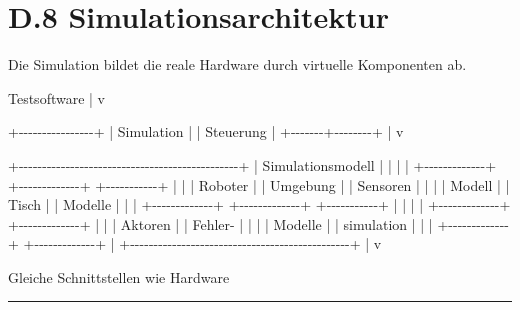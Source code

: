\documentclass[
]{article}
\newenvironment{Shaded}{}{}
\newcommand{\NormalTok}[1]{#1}
\begin{document}
\section{D.8 Simulationsarchitektur}\label{d.8-simulationsarchitektur}

Die Simulation bildet die reale Hardware durch virtuelle Komponenten ab.

\begin{Shaded}
\begin{Highlighting}[]
\NormalTok{                 Testsoftware}
\NormalTok{                      |}
\NormalTok{                      v}

\NormalTok{             +{-}{-}{-}{-}{-}{-}{-}{-}{-}{-}{-}{-}{-}{-}{-}{-}+}
\NormalTok{             | Simulation     |}
\NormalTok{             | Steuerung      |}
\NormalTok{             +{-}{-}{-}{-}{-}{-}{-}+{-}{-}{-}{-}{-}{-}{-}{-}+}
\NormalTok{                     |}
\NormalTok{                     v}

\NormalTok{+{-}{-}{-}{-}{-}{-}{-}{-}{-}{-}{-}{-}{-}{-}{-}{-}{-}{-}{-}{-}{-}{-}{-}{-}{-}{-}{-}{-}{-}{-}{-}{-}{-}{-}{-}{-}{-}{-}{-}{-}{-}{-}{-}{-}{-}{-}{-}+}
\NormalTok{|              Simulationsmodell                |}
\NormalTok{|                                               |}
\NormalTok{| +{-}{-}{-}{-}{-}{-}{-}{-}{-}{-}{-}{-}{-}+ +{-}{-}{-}{-}{-}{-}{-}{-}{-}{-}{-}{-}{-}+ +{-}{-}{-}{-}{-}{-}{-}{-}{-}{-}{-}+ |}
\NormalTok{| | Roboter     | | Umgebung    | | Sensoren  | |}
\NormalTok{| | Modell      | | Tisch       | | Modelle   | |}
\NormalTok{| +{-}{-}{-}{-}{-}{-}{-}{-}{-}{-}{-}{-}{-}+ +{-}{-}{-}{-}{-}{-}{-}{-}{-}{-}{-}{-}{-}+ +{-}{-}{-}{-}{-}{-}{-}{-}{-}{-}{-}+ |}
\NormalTok{|                                               |}
\NormalTok{| +{-}{-}{-}{-}{-}{-}{-}{-}{-}{-}{-}{-}{-}+ +{-}{-}{-}{-}{-}{-}{-}{-}{-}{-}{-}{-}{-}+               |}
\NormalTok{| | Aktoren     | | Fehler{-}     |               |}
\NormalTok{| | Modelle     | | simulation |               |}
\NormalTok{| +{-}{-}{-}{-}{-}{-}{-}{-}{-}{-}{-}{-}{-}+ +{-}{-}{-}{-}{-}{-}{-}{-}{-}{-}{-}{-}{-}+               |}
\NormalTok{+{-}{-}{-}{-}{-}{-}{-}{-}{-}{-}{-}{-}{-}{-}{-}{-}{-}{-}{-}{-}{-}{-}{-}{-}{-}{-}{-}{-}{-}{-}{-}{-}{-}{-}{-}{-}{-}{-}{-}{-}{-}{-}{-}{-}{-}{-}{-}+}
\NormalTok{                     |}
\NormalTok{                     v}

\NormalTok{          Gleiche Schnittstellen wie Hardware}
\end{Highlighting}
\end{Shaded}

\begin{center}\rule{0.5\linewidth}{0.5pt}\end{center}
\end{document}

